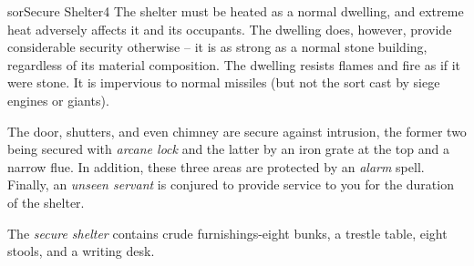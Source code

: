 \begin{spellcard}{sor}{Secure Shelter}{4}
  The shelter must be heated as a normal dwelling, and extreme heat adversely affects it and its occupants.
  The dwelling does, however, provide considerable security otherwise --
  it is as strong as a normal stone building, regardless of its material composition.
  The dwelling resists flames and fire as if it were stone.
  It is impervious to normal missiles (but not the sort cast by siege engines or giants).

  The door, shutters, and even chimney are secure against intrusion,
  the former two being secured with \emph{arcane lock}
  and the latter by an iron grate at the top and a narrow flue.
  In addition, these three areas are protected by an \emph{alarm} spell.
  Finally, an \emph{unseen servant} is conjured to provide service to you
  for the duration of the shelter.

  The \emph{secure shelter} contains crude furnishings-eight bunks, a
  trestle table, eight stools, and a writing desk.
\end{spellcard}
